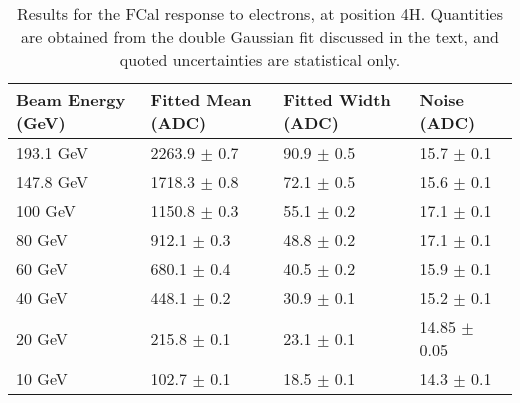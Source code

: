 \begin{table}[p]
\begin{center}
\begin{tabular}{|l|l|l|l|}
\hline
Beam Energy (GeV) & Fitted Mean (ADC)& Fitted Width (ADC)& Noise (ADC) \\
\hline
193.1 GeV  &  2263.9 $\pm$     0.7 &    90.9 $\pm$     0.5 &    15.7 $\pm$     0.1 \\
147.8 GeV  &  1718.3 $\pm$     0.8 &    72.1 $\pm$     0.5 &    15.6 $\pm$     0.1 \\
100 GeV  &  1150.8 $\pm$     0.3 &    55.1 $\pm$     0.2 &    17.1 $\pm$     0.1 \\
80 GeV  &   912.1 $\pm$     0.3 &    48.8 $\pm$     0.2 &    17.1 $\pm$     0.1 \\
60 GeV  &   680.1 $\pm$     0.4 &    40.5 $\pm$     0.2 &    15.9 $\pm$     0.1 \\
40 GeV  &   448.1 $\pm$     0.2 &    30.9 $\pm$     0.1 &    15.2 $\pm$     0.1 \\
20 GeV  &   215.8 $\pm$     0.1 &    23.1 $\pm$     0.1 &    14.85 $\pm$     0.05 \\
10 GeV  &   102.7 $\pm$     0.1 &    18.5 $\pm$     0.1 &    14.3 $\pm$     0.1 \\
\hline
\end{tabular}
\end{center}
\caption[Results for the FCal response to electrons, 4H]{Results for the FCal response to electrons, at position 4H. Quantities are obtained from the double Gaussian fit discussed in the text, and quoted uncertainties are statistical only.}
\label{TBres_table_elec_4H}
\end{table}


